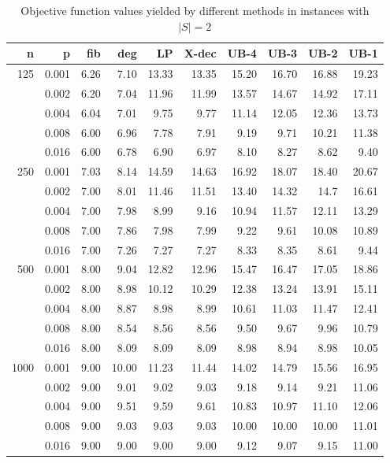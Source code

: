 \begin{table}[]
\centering
\begin{tabular}{rrrrrrrrrr}
n     &	p & fib  & deg  & LP    & X-dec & UB-4  & UB-3  & UB-2  & UB-1  \\
\hline
\multirow{5}{*}{125} 
& 0.001 & 6.26 & 7.10 & 13.33 & 13.35 & 15.20 & 16.70 & 16.88 & 19.23 \\
& 0.002 & 6.20 & 7.04 & 11.96 & 11.99 & 13.57 & 14.67 & 14.92 & 17.11 \\
& 0.004 & 6.04 & 7.01 & 9.75  & 9.77  & 11.14 & 12.05 & 12.36 & 13.73 \\
& 0.008 & 6.00 & 6.96 & 7.78  & 7.91  & 9.19  & 9.71  & 10.21 & 11.38 \\
& 0.016 & 6.00 & 6.78 & 6.90  & 6.97  & 8.10  & 8.27  & 8.62  & 9.40  \\
\hline
\multirow{5}{*}{250} 
& 0.001 & 7.03 & 8.14 & 14.59 & 14.63 & 16.92 & 18.07 & 18.40 & 20.67 \\
& 0.002 & 7.00 & 8.01 & 11.46 & 11.51 & 13.40 & 14.32 & 14.7  & 16.61 \\
& 0.004 & 7.00 & 7.98 & 8.99  & 9.16  & 10.94 & 11.57 & 12.11 & 13.29 \\
& 0.008 & 7.00 & 7.86 & 7.98  & 7.99  & 9.22  & 9.61  & 10.08 & 10.89 \\
& 0.016 & 7.00 & 7.26 & 7.27  & 7.27  & 8.33  & 8.35  & 8.61  & 9.44  \\
\hline
\multirow{5}{*}{500} 
& 0.001 & 8.00 & 9.04 & 12.82 &12.96  &15.47  & 16.47 & 17.05 & 18.86 \\
& 0.002 & 8.00 & 8.98 & 10.12 &10.29  &12.38  & 13.24 & 13.91 & 15.11 \\
& 0.004 & 8.00 & 8.87 & 8.98  &8.99   &10.61  & 11.03 & 11.47 & 12.41 \\
& 0.008 & 8.00 & 8.54 & 8.56  &8.56   &9.50   & 9.67  & 9.96  & 10.79 \\
& 0.016 & 8.00 & 8.09 & 8.09  &8.09   &8.98   & 8.94  & 8.98  & 10.05 \\
\hline
\multirow{5}{*}{1000} 
& 0.001 & 9.00 & 10.00 & 11.23 & 11.44 & 14.02 & 14.79 & 15.56 & 16.95 \\
& 0.002 & 9.00 & 9.01  & 9.02  & 9.03  & 9.18  & 9.14  & 9.21  & 11.06 \\
& 0.004 & 9.00 & 9.51  & 9.59  & 9.61  & 10.83 & 10.97 & 11.10 & 12.06 \\
& 0.008 & 9.00 & 9.03  & 9.03  & 9.03  & 10.00 & 10.00 & 10.00 & 11.01 \\
& 0.016 & 9.00 & 9.00  & 9.00  & 9.00  & 9.12  & 9.07  & 9.15  & 11.00 \\
\end{tabular}
\caption{Objective function values yielded by different methods in instances with $|S|=2$}
\label{tab:obj-s2}
\end{table}

